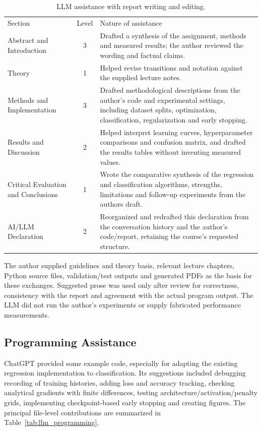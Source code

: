 \documentclass[aps,rmp,reprint,amsmath,amssymb,graphicx,longbibliography]{revtex4-1}
\begin{document}
\begin{table}[t]
\centering
\caption{LLM assistance with report writing and editing.}
\label{tab:llm_writing}
\begin{ruledtabular}
\begin{tabular}{p{}cp{}}
Section & Level & Nature of assistance \\
Abstract and Introduction & 3 & Drafted a synthesis of the assignment,
methods and measured results; the author reviewed the wording and factual claims. \\
Theory & 1 & Helped revise transitions and notation against the supplied lecture notes. \\
Methods and Implementation & 3 & Drafted methodological descriptions from
the author's code and experimental settings, including dataset splits,
optimization, classification, regularization and early stopping. \\
Results and Discussion & 2 & Helped interpret
learning curves, hyperparameter comparisons and confusion matrix, and drafted
the results tables without inventing measured values. \\
Critical Evaluation and Conclusions & 1 & Wrote the comparative synthesis
of the regression and classification algorithms, strengths, limitations
and follow-up experiments from the authors draft. \\
AI/LLM Declaration & 2 & Reorganized and redrafted this declaration from
the conversation history and the author's code/report, retaining the
course's requested structure. \\
\end{tabular}
\end{ruledtabular}
\end{table}

The author supplied guidelines and theory basis, relevant lecture chapters,
Python source files, validation/test outputs and generated PDFs as the
basis for these exchanges. Suggested prose was used only after review
for correctness, consistency with the report and agreement with the
actual program output. The LLM did not run the author's experiments
or supply fabricated performance measurements.

\subsection{Programming Assistance}

ChatGPT provided some example code, especially
for adapting the existing regression implementation to classification.
Its suggestions included debugging recording of training histories,
adding loss and accuracy tracking, checking analytical gradients with
finite differences, testing architecture/activation/penalty grids,
implementing checkpoint-based early stopping and creating figures.
The principal file-level contributions are summarized in
Table~\ref{tab:llm_programming}.
\end{document}
